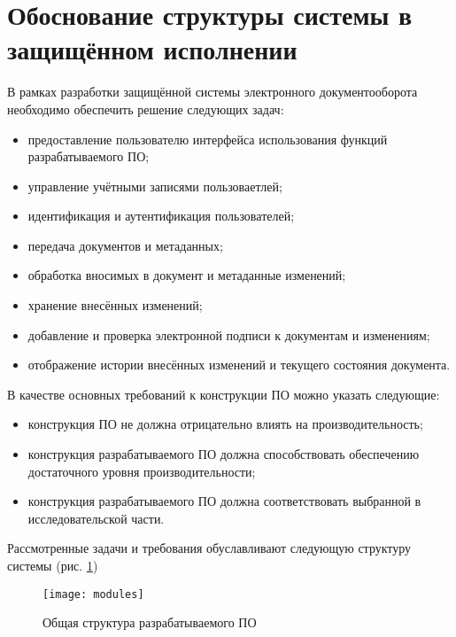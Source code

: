 \section{Обоснование структуры системы в защищённом исполнении} \label{model}

В рамках разработки защищённой системы электронного документооборота необходимо обеспечить решение следующих задач:
\begin{itemize}
	\item предоставление пользователю интерфейса использования функций разрабатываемого ПО;
	\item управление учётными записями пользоваетлей;
	\item идентификация и аутентификация пользователей;
	\item передача документов и метаданных;
	\item обработка вносимых в документ и метаданные изменений;
	\item хранение внесённых изменений;
	\item добавление и проверка электронной подписи к документам и изменениям;
	\item отображение истории внесённых изменений и текущего состояния документа.
\end{itemize}

\vspace{\baselineskip}
В качестве основных требований к конструкции ПО можно указать следующие:
\begin{itemize}
	\item конструкция ПО не должна отрицательно влиять на производительность;
	\item конструкция разрабатываемого ПО должна способствовать обеспечению достаточного уровня производительности;
	\item конструкция разрабатываемого ПО должна соответствовать выбранной в исследовательской части.
\end{itemize}

\vspace{\baselineskip}
Рассмотренные задачи и требования обуславливают следующую структуру системы (рис. \ref{img:modules})
\begin{figure}[h!]
  \centering
  \texttt{[image: modules]}
  \caption{Общая структура разрабатываемого ПО}
  \label{img:modules}
\end{figure}

